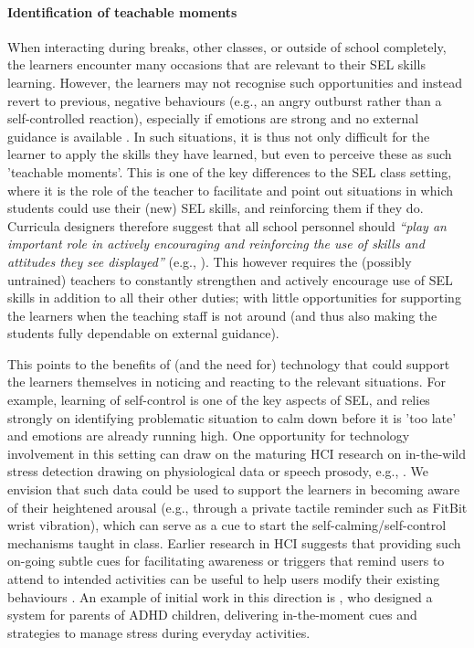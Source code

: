 \documentclass[prodmode,acmtochi]{acmsmall}
\newcommand{\todolater}[1]{}
\newcommand{\inqq}[1]{\textrm{\textit{``#1''}}}
\begin{document}
\paragraph{Identification of teachable moments}
When interacting during breaks, other classes, or outside of school completely, the learners encounter many occasions that are relevant to their SEL skills learning. However, the learners may not recognise such opportunities and instead revert to previous, negative behaviours (e.g., an angry outburst rather than a self-controlled reaction), especially if emotions are strong and no external guidance is available \cite[p. 56]{Elias1997}.  In such situations, it is thus not only difficult for the learner to apply the skills they have learned, but even to perceive these as such 'teachable moments'. This is one of the key differences to the SEL class setting, where it is the role of the teacher to facilitate and point out situations in which students could use their (new) SEL skills, and reinforcing them if they do. 
%
Curricula designers therefore suggest that all school personnel should \inqq{play an important role in actively encouraging and reinforcing the use of skills and attitudes they see displayed} (e.g., \cite[p. 56]{Elias1997}). This however requires the (possibly untrained) teachers to constantly strengthen and actively encourage use of SEL skills in addition to all their other duties; with little opportunities for supporting the learners when the teaching staff is not around (and thus also making the students fully dependable on external guidance). 

This points to the benefits of (and the need for) technology that could support the learners themselves in noticing and reacting to the relevant situations. For example, learning of self-control is one of the key aspects of SEL, and relies strongly on identifying problematic situation to calm down before it is 'too late' and emotions are already running high. One opportunity for technology involvement in this setting can draw on the maturing HCI research on in-the-wild stress detection drawing on physiological data or speech prosody, e.g., \cite{Hernandez2011,Poh2010,Pina2014,Zeng2009,Ertin2011}. We envision that such data could be used to support the learners in becoming aware of their heightened arousal (e.g., through a private tactile reminder such as FitBit wrist vibration), which can serve as a cue to start the self-calming/self-control mechanisms taught in class. Earlier research in HCI suggests that providing such on-going subtle cues for facilitating awareness or triggers that remind users to attend to intended activities can be useful to help users modify their existing behaviours \cite{Consolvo2009,Obermair2008}. An example of initial work in this direction is , who designed a system for parents of ADHD children, delivering in-the-moment cues and strategies to manage stress during everyday activities.  
\todolater{???Other similar opportunities for technology could be in supporting other learned topics such as prompting awareness of own emotions, }
\end{document}
